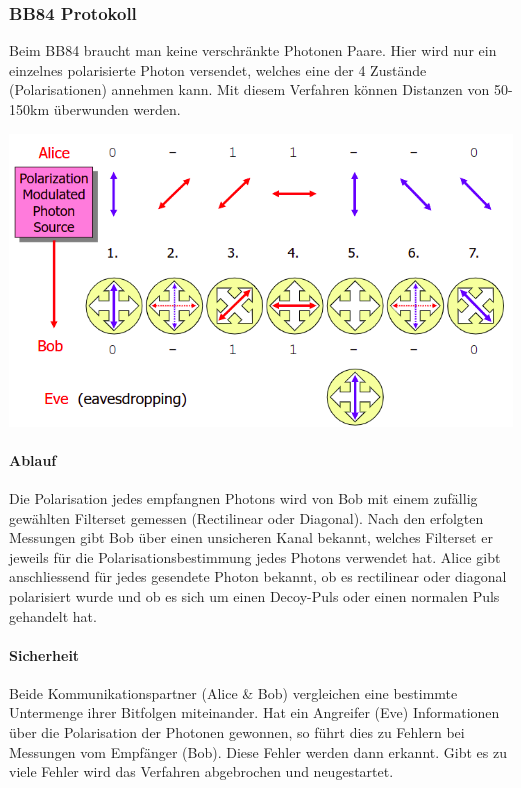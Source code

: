\subsubsection{BB84 Protokoll}
Beim BB84 braucht man keine verschränkte Photonen Paare. Hier wird nur ein einzelnes polarisierte Photon versendet, welches eine der 4 Zustände (Polarisationen) annehmen kann. Mit diesem Verfahren können Distanzen von 50-150km überwunden werden.

\begin{minipage}[t]{1\textwidth}
    \centering
	\includegraphics[width=0.9\linewidth]{images/bb84.png}
\label{fig:entangledphotons}
\end{minipage}

\paragraph{Ablauf}
Die Polarisation jedes empfangnen Photons wird von Bob mit einem zufällig gewählten Filterset gemessen (Rectilinear oder Diagonal). Nach den erfolgten Messungen gibt Bob über einen unsicheren 
Kanal bekannt, welches Filterset er jeweils für die Polarisationsbestimmung jedes Photons verwendet hat. Alice gibt anschliessend für jedes gesendete Photon bekannt, ob es rectilinear oder diagonal polarisiert wurde und ob es sich um einen Decoy-Puls oder einen normalen Puls gehandelt hat. 


\paragraph{Sicherheit}
Beide Kommunikationspartner (Alice \& Bob) vergleichen eine bestimmte Untermenge ihrer Bitfolgen miteinander. Hat ein Angreifer (Eve) Informationen über die Polarisation der Photonen gewonnen, so führt dies zu Fehlern bei Messungen vom Empfänger (Bob). Diese Fehler werden dann erkannt. Gibt es zu viele Fehler wird das Verfahren abgebrochen und neugestartet.

